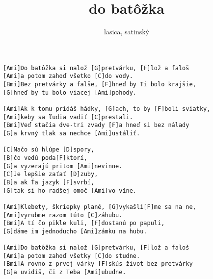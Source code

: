 \author{lasica, satinský}
\title{do batôžka}
\maketitle
\begin{verbatim}
[Ami]Do batôžka si nalož [G]pretvárku, [F]lož a faloš
[Ami]a potom zahoď všetko [C]do vody.
[Bmi]Bez pretvárky a falše, [F]hneď by Ti bolo krajšie,
[G]hneď by tu bolo viacej [Ami]pohody.

[Ami]Ak k tomu pridáš hádky, [G]ach, to by [F]boli sviatky,
[Ami]keby sa ľudia vadiť [C]prestali.
[Bmi]Veď stačia dve-tri zvady [F]a hneď si bez nálady
[G]a krvný tlak sa nechce [Ami]ustáliť.

[C]Načo sú hlúpe [D]spory,
[B]čo vedú poda[F]ktorí,
[G]a vyzerajú pritom [Ami]nevinne.
[C]Je lepšie zaťať [D]zuby,
[B]a ak Ťa jazyk [F]svrbí,
[G]tak si ho radšej omoč [Ami]vo víne.

[Ami]Klebety, škriepky plané, [G]vykašli[F]me sa na ne,
[Ami]vyrubme razom túto [C]záhubu.
[Bmi]A tí čo pikle kuli, [F]dostanú po papuli,
[G]dáme im jednoducho [Ami]zámku na hubu.

[Ami]Do batôžka si nalož [G]pretvárku, [F]lož a faloš
[Ami]a potom zahoď všetky [C]do studne.
[Bmi]A rovno z prvej várky [F]skús život bez pretvárky
[G]a uvidíš, či z Teba [Ami]ubudne.
\end{verbatim}